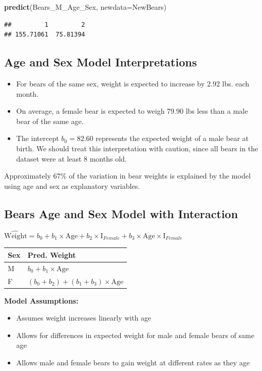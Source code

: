 \documentclass[]{book}
\newenvironment{Shaded}{\begin{snugshade}}{\end{snugshade}}
\newcommand{\KeywordTok}[1]{\textcolor[rgb]{0.13,0.29,0.53}{\textbf{#1}}}
\newcommand{\DataTypeTok}[1]{\textcolor[rgb]{0.13,0.29,0.53}{#1}}
\newcommand{\NormalTok}[1]{#1}
\providecommand{\tightlist}{%
  \setlength{\itemsep}{0pt}\setlength{\parskip}{0pt}}
\begin{document}
\begin{Shaded}
\begin{Highlighting}[]
\KeywordTok{predict}\NormalTok{(Bears_M_Age_Sex, }\DataTypeTok{newdata=}\NormalTok{NewBears)}
\end{Highlighting}
\end{Shaded}

\begin{verbatim}
##         1         2 
## 155.71061  75.81394
\end{verbatim}

\subsection{Age and Sex Model
Interpretations}\label{age-and-sex-model-interpretations}

\begin{itemize}
\item
  For bears of the same sex, weight is expected to increase by 2.92 lbs.
  each month.
\item
  On average, a female bear is expected to weigh 79.90 lbs less than a
  male bear of the same age.
\item
  The intercept \(b_0=82.60\) represents the expected weight of a male
  bear at birth. We should treat this interpretation with caution, since
  all bears in the dataset were at least 8 months old.
\end{itemize}

Approximately 67\% of the variation in bear weights is explained by the
model using age and sex as explanatory variables.

\subsection{Bears Age and Sex Model with
Interaction}\label{bears-age-and-sex-model-with-interaction}

\(\widehat{\text{Weight}}= b_0+ b_1 \times\text{Age}+ b_2\times\text{I}_{Female} + b_3\times\text{Age}\times\text{I}_{Female}\)

\begin{longtable}[]{@{}ll@{}}
\toprule
Sex & Pred. Weight\tabularnewline
\midrule
\endhead
M & \(b_0 + b_1 \times\text{Age}\)\tabularnewline
F & \((b_0 + b_2) + (b_1 + b_3) \times\text{Age}\)\tabularnewline
\bottomrule
\end{longtable}

\textbf{Model Assumptions:}

\begin{itemize}
\tightlist
\item
  Assumes weight increases linearly with age\\
\item
  Allows for differences in expected weight for male and female bears of
  same age\\
\item
  Allows male and female bears to gain weight at different rates as they
  age
\end{itemize}
\end{document}
